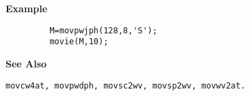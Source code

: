 {\bf \large {}\selectfont Example}
\begin{verbatim}
         M=movpwjph(128,8,'S'); 
         movie(M,10);
\end{verbatim}
\vspace*{.5cm}


{\bf \large {}\selectfont See Also}\\
\hspace*{1.5cm}
\begin{minipage}[t]{13.5cm}
\begin{verbatim}
movcw4at, movpwdph, movsc2wv, movsp2wv, movwv2at.
\end{verbatim}
\end{minipage}
